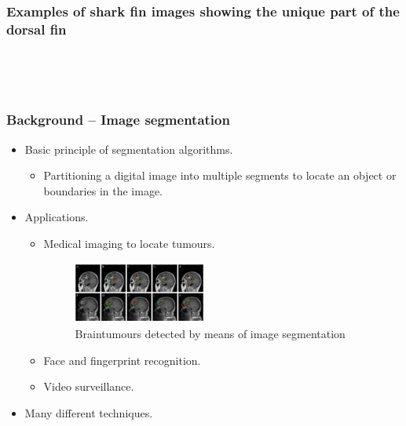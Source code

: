 \documentclass{beamer}
\newcommand{\myitem}{\item[$-$]}
\begin{document}
\begin{frame}
\frametitle{Examples of shark fin images showing the unique part of the dorsal fin}
\begin{figure}
\centering
\mbox{ \quad
{}}
\end{figure}
\begin{figure}
\centering
\mbox{ \quad
{}}
\end{figure}
\end{frame}


\begin{frame}
\frametitle{Background -- Image segmentation}
\begin{itemize}
\item Basic principle of segmentation algorithms.
\begin{itemize}
\myitem Partitioning a digital image into multiple segments to locate an object or
boundaries in the image.
\end{itemize}
\item Applications.
\begin{itemize}
\myitem Medical imaging to locate tumours.
\begin{figure}
 \centering
 \includegraphics[width=1.7in, height=0.8in]{braintumor.jpg}
 \caption{Braintumours detected by means of image segmentation}
 \end{figure}
\myitem Face and fingerprint recognition.
\myitem Video surveillance.
\end{itemize}
\item Many different techniques.
\end{itemize}
\end{frame}
\end{document}
